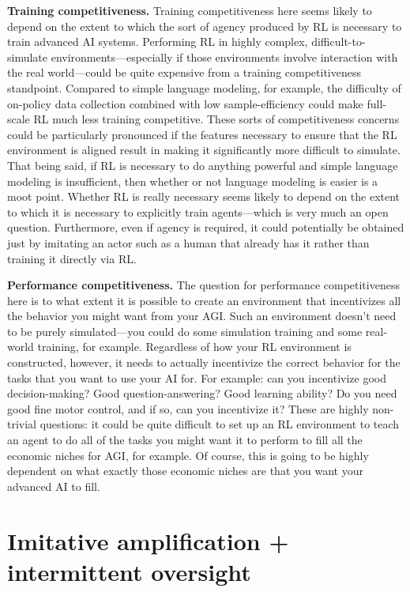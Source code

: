 \textbf{Training competitiveness.} Training competitiveness here seems likely to depend on the extent to which the sort of agency produced by RL is necessary to train advanced AI systems. Performing RL in highly complex, difficult-to-simulate environments---especially if those environments involve interaction with the real world---could be quite expensive from a training competitiveness standpoint. Compared to simple language modeling, for example, the difficulty of on-policy data collection combined with low sample-efficiency could make full-scale RL much less training competitive. These sorts of competitiveness concerns could be particularly pronounced if the features necessary to ensure that the RL environment is aligned result in making it significantly more difficult to simulate. That being said, if RL is necessary to do anything powerful and simple language modeling is insufficient, then whether or not language modeling is easier is a moot point. Whether RL is really necessary seems likely to depend on the extent to which it is necessary to explicitly train agents---which is very much an open question. Furthermore, even if agency is required, it could potentially be obtained just by imitating an actor such as a human that already has it rather than training it directly via RL.

\textbf{Performance competitiveness.} The question for performance competitiveness here is to what extent it is possible to create an environment that incentivizes all the behavior you might want from your AGI. Such an environment doesn't need to be purely simulated---you could do some simulation training and some real-world training, for example. Regardless of how your RL environment is constructed, however, it needs to actually incentivize the correct behavior for the tasks that you want to use your AI for. For example: can you incentivize good decision-making? Good question-answering? Good learning ability? Do you need good fine motor control, and if so, can you incentivize it? These are highly non-trivial questions: it could be quite difficult to set up an RL environment to teach an agent to do all of the tasks you might want it to perform to fill all the economic niches for AGI, for example. Of course, this is going to be highly dependent on what exactly those economic niches are that you want your advanced AI to fill.

\section{Imitative amplification + intermittent oversight}
\label{sec:2}

